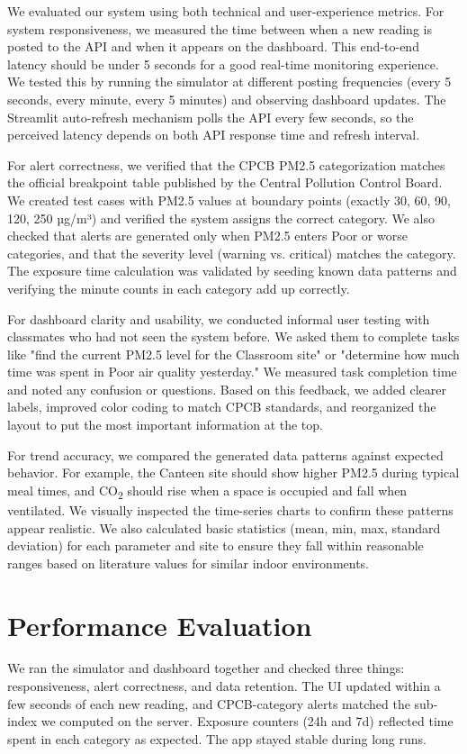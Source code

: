 \documentclass[12pt]{report}
\begin{document}
We evaluated our system using both technical and user-experience metrics. For system responsiveness, we measured the time between when a new reading is posted to the API and when it appears on the dashboard. This end-to-end latency should be under 5 seconds for a good real-time monitoring experience. We tested this by running the simulator at different posting frequencies (every 5 seconds, every minute, every 5 minutes) and observing dashboard updates. The Streamlit auto-refresh mechanism polls the API every few seconds, so the perceived latency depends on both API response time and refresh interval.

For alert correctness, we verified that the CPCB PM2.5 categorization matches the official breakpoint table published by the Central Pollution Control Board. We created test cases with PM2.5 values at boundary points (exactly 30, 60, 90, 120, 250 µg/m³) and verified the system assigns the correct category. We also checked that alerts are generated only when PM2.5 enters Poor or worse categories, and that the severity level (warning vs. critical) matches the category. The exposure time calculation was validated by seeding known data patterns and verifying the minute counts in each category add up correctly.

For dashboard clarity and usability, we conducted informal user testing with classmates who had not seen the system before. We asked them to complete tasks like "find the current PM2.5 level for the Classroom site" or "determine how much time was spent in Poor air quality yesterday." We measured task completion time and noted any confusion or questions. Based on this feedback, we added clearer labels, improved color coding to match CPCB standards, and reorganized the layout to put the most important information at the top.

For trend accuracy, we compared the generated data patterns against expected behavior. For example, the Canteen site should show higher PM2.5 during typical meal times, and CO\textsubscript{2} should rise when a space is occupied and fall when ventilated. We visually inspected the time-series charts to confirm these patterns appear realistic. We also calculated basic statistics (mean, min, max, standard deviation) for each parameter and site to ensure they fall within reasonable ranges based on literature values for similar indoor environments.

\section{Performance Evaluation}
We ran the simulator and dashboard together and checked three things: responsiveness, alert correctness, and data retention. The UI updated within a few seconds of each new reading, and CPCB-category alerts matched the sub-index we computed on the server. Exposure counters (24h and 7d) reflected time spent in each category as expected. The app stayed stable during long runs.
\end{document}
